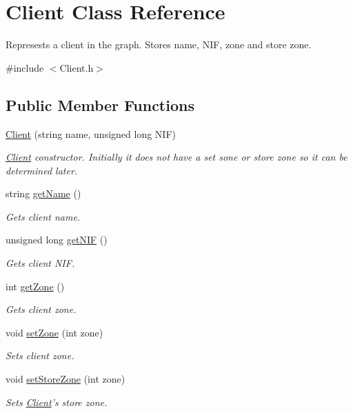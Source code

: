 \hypertarget{classClient}{\section{Client Class Reference}
\label{classClient}
}


Represests a client in the graph. Stores name, N\-I\-F, zone and store zone.  




{\ttfamily \#include $<$Client.\-h$>$}

\subsection*{Public Member Functions}
\begin{DoxyCompactItemize}
\item 
\hyperlink{classClient_a536244b1fef9e107769dd1e626606994}{Client} (string name, unsigned long N\-I\-F)
\begin{DoxyCompactList}\small\item\em \hyperlink{classClient}{Client} constructor. Initially it does not have a set sone or store zone so it can be determined later. \end{DoxyCompactList}\item 
string \hyperlink{classClient_aa2eff010fd1f9ac7bab938b8d432b55f}{get\-Name} ()
\begin{DoxyCompactList}\small\item\em Gets client name. \end{DoxyCompactList}\item 
unsigned long \hyperlink{classClient_a059dedac3349c4b07a03de76a613ed26}{get\-N\-I\-F} ()
\begin{DoxyCompactList}\small\item\em Gets client N\-I\-F. \end{DoxyCompactList}\item 
int \hyperlink{classClient_aa0d1054fb50575f0b2a8469d6fa4acf9}{get\-Zone} ()
\begin{DoxyCompactList}\small\item\em Gets client zone. \end{DoxyCompactList}\item 
void \hyperlink{classClient_ad92d3d3c599e9662378c41b7937cf568}{set\-Zone} (int zone)
\begin{DoxyCompactList}\small\item\em Sets client zone. \end{DoxyCompactList}\item 
void \hyperlink{classClient_a440b60950611f1ac80116fb2e6edfea6}{set\-Store\-Zone} (int zone)
\begin{DoxyCompactList}\small\item\em Sets \hyperlink{classClient}{Client}'s store zone. \end{DoxyCompactList}\end{DoxyCompactItemize}
